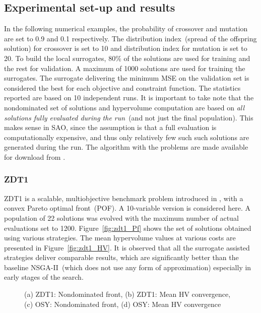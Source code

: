\subsection{Experimental set-up and results} In the following numerical examples, the probability of
crossover and mutation are set to 0.9 and 0.1 respectively. The distribution index~(spread of the offspring solution) for crossover is
set to 10 and distribution index for mutation is set to 20. To build the local surrogates, 80\% of
the solutions are used for training and the rest for validation. A maximum of 1000 solutions are
used for training the surrogates. The surrogate delivering the minimum MSE on the validation set is
considered the best for each objective and constraint function. The statistics reported are based on
10 independent runs. It is important to take note that the nondominated set of solutions and
hypervolume computation are based on \textit{all solutions fully evaluated during the run}~(and not
just the final population). This makes sense in SAO, since the assumption is that a full evaluation
is computationally expensive, and thus only relatively few such such solutions are generated during
the run. The algorithm with the problems are made available for download from \cite{mdolabsamois}.

\subsubsection{ZDT1}

ZDT1 is a scalable, multiobjective benchmark problem introduced in \cite{zitzler2000mo}, with a
convex Pareto optimal front~(POF). A 10-variable version is considered here. A population of 22
solutions was evolved with the maximum number of actual evaluations set to 1200.
Figure~\ref{fig:zdt1_Pf} shows the set of solutions obtained using various strategies. The mean
hypervolume values at various costs are presented in Figure~\ref{fig:zdt1_HV}. It is observed that
all the surrogate assisted strategies deliver comparable results, which are significantly better
than the baseline NSGA-II~(which does not use any form of approximation) especially in early stages
of the search.

\begin{figure*}[!htb] \centering
	\caption{(a) ZDT1: Nondominated front, (b) ZDT1: Mean HV convergence, (c) OSY: Nondominated front, (d) OSY: Mean HV convergence}
	\label{fig:zdt1osy_Pareto} \end{figure*}

